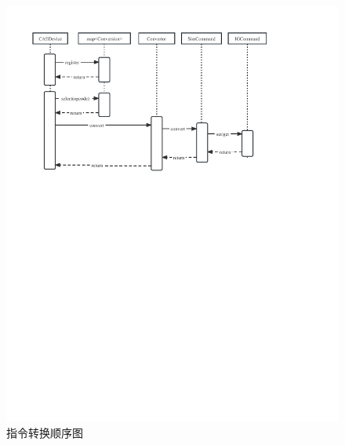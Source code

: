\begin{figure}[h!]
    \begin{center}
        \includegraphics[width=\textwidth]{pictures/sequence2.pdf}
        \caption{指令转换顺序图}
        \label{seq2}
    \end{center}
\end{figure}
